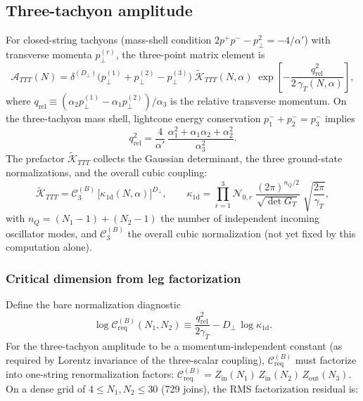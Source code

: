 \documentclass[11pt]{article}
\newcommand{\al}{\alpha'}
\newcommand{\perpD}{D_\perp}
\begin{document}
\subsection{Three-tachyon amplitude}

For closed-string tachyons (mass-shell condition $2p^+p^- - p_\perp^2 = -4/\al$) with transverse momenta $p_\perp^{(r)}$, the three-point matrix element is
\begin{equation}
\mathcal{A}_{TTT}(N) = \delta^{(\perpD)}\!\bigl(p_\perp^{(1)} + p_\perp^{(2)} - p_\perp^{(3)}\bigr)\;
\widetilde{\mathcal{K}}_{TTT}(N, \alpha)\;
\exp\!\left[-\frac{q_{\mathrm{rel}}^2}{2\,\gamma_T(N, \alpha)}\right],
\label{eq:ttt}
\end{equation}
where $q_{\mathrm{rel}} \equiv (\alpha_2 p_\perp^{(1)} - \alpha_1 p_\perp^{(2)})/\alpha_3$ is the relative transverse momentum. On the three-tachyon mass shell, lightcone energy conservation $p_1^- + p_2^- = p_3^-$ implies
\begin{equation}
q_{\mathrm{rel}}^2 = \frac{4}{\al}\,\frac{\alpha_1^2 + \alpha_1\alpha_2 + \alpha_2^2}{\alpha_3^2}.
\label{eq:qrel-ttt}
\end{equation}
The prefactor $\widetilde{\mathcal{K}}_{TTT}$ collects the Gaussian determinant, the three ground-state normalizations, and the overall cubic coupling:
\begin{equation}
\widetilde{\mathcal{K}}_{TTT} = \mathcal{C}_3^{(B)}\,\bigl[\kappa_{1\mathrm{d}}(N, \alpha)\bigr]^{\perpD},
\qquad
\kappa_{1\mathrm{d}} = \prod_{r=1}^3\mathcal{N}_{0,r}\;
\frac{(2\pi)^{n_Q/2}}{\sqrt{\det G_T}}\;\sqrt{\frac{2\pi}{\gamma_T}},
\label{eq:kappa}
\end{equation}
with $n_Q = (N_1 - 1) + (N_2 - 1)$ the number of independent incoming oscillator modes, and $\mathcal{C}_3^{(B)}$ the overall cubic normalization (not yet fixed by this computation alone).

\subsubsection{Critical dimension from leg factorization}

Define the bare normalization diagnostic
\begin{equation}
\log\mathcal{C}_{\mathrm{req}}^{(B)}(N_1, N_2) \equiv \frac{q_{\mathrm{rel}}^2}{2\gamma_T} - \perpD\,\log\kappa_{1\mathrm{d}}.
\label{eq:creq}
\end{equation}
For the three-tachyon amplitude to be a momentum-independent constant (as required by Lorentz invariance of the three-scalar coupling), $\mathcal{C}_{\mathrm{req}}^{(B)}$ must factorize into one-string renormalization factors: $\mathcal{C}_{\mathrm{req}}^{(B)} = Z_{\mathrm{in}}(N_1)\,Z_{\mathrm{in}}(N_2)\,Z_{\mathrm{out}}(N_3)$. On a dense grid of $4 \le N_1, N_2 \le 30$ (729 joins), the RMS factorization residual is:
\end{document}

